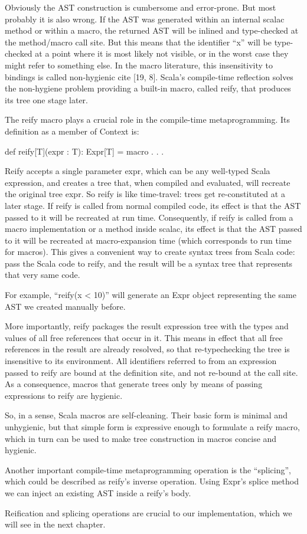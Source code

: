 Obviously the AST construction is cumbersome and error-prone. But most probably
it is also wrong. If the AST was generated within an internal scalac method or
within a macro, the returned AST will be inlined and type-checked at the
method/macro call site. But this means that the identifier ``x'' will be
type-checked at a point where it is most likely not visible, or in the worst
case they might refer to something else. In the macro literature, this
insensitivity to bindings is called non-hygienic {cite [19, 8]}. Scala's
compile-time reflection solves the non-hygiene problem providing a built-in
macro, called reify, that produces its tree one stage later.

The reify macro plays a crucial role in the compile-time metaprogramming. Its
definition as a member of Context is:

def reify[T](expr : T): Expr[T] = macro . . .

Reify accepts a single parameter expr, which can be any well-typed Scala
expression, and creates a tree that, when compiled and evaluated, will recreate
the original tree expr. So reify is like time-travel: trees get re-constituted
at a later stage. If reify is called from normal compiled code, its effect is
that the AST passed to it will be recreated at run time.
Consequently, if reify is called from a macro implementation or a method inside
scalac, its effect is that the AST passed to it will be recreated at
macro-expansion time (which corresponds to run time for macros). This gives a
convenient way to create syntax trees from Scala code: pass the Scala code to
reify, and the result will be a syntax tree that represents that very same code.

For example, ``reify(x < 10)'' will generate an Expr object representing the
same AST we created manually before.

More importantly, reify packages the result expression tree with the types and
values of all free references that occur in it. This means in effect that all
free references in the result are already resolved, so that re-typechecking the
tree is insensitive to its environment. All identifiers referred to from
an expression passed to reify are bound at the definition site, and not re-bound
at the call site. As a consequence, macros that generate trees only by means
of passing expressions to reify are hygienic.

So, in a sense, Scala macros are self-cleaning. Their basic form is minimal
and unhygienic, but that simple form is expressive enough to formulate a
reify macro, which in turn can be used to make tree construction in macros
concise and hygienic.

Another important compile-time metaprogramming operation is the ``splicing'',
which could be described as reify's inverse operation. Using Expr's splice
method we can inject an existing AST inside a reify's body.

Reification and splicing operations are crucial to our implementation, which we
will see in the next chapter.